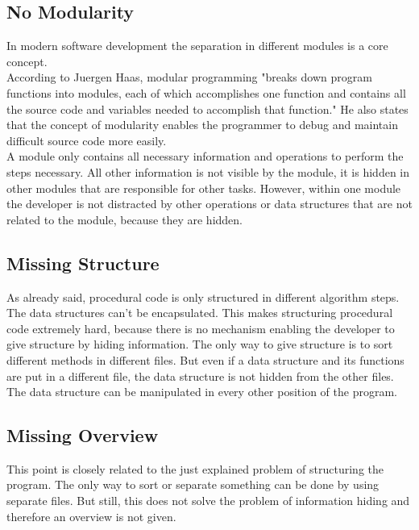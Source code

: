 \subsection*{No Modularity}
\label{problem:nomodularity}
In modern software development the separation in different modules is a core concept.\\

According to Juergen Haas, modular programming "breaks down program functions into modules, each of which accomplishes one function and contains all the source code and variables needed to accomplish that function." \cite{about} He also states that the concept of modularity enables the programmer to debug and maintain difficult source code more easily. \\

A module only contains all necessary information and operations to perform the steps necessary. All other information is not visible by the module, it is hidden in other modules that are responsible for other tasks. However, within one module the developer is not distracted by other operations or data structures that are not related to the module, because they are hidden. 

\subsection*{Missing Structure}
As already said, procedural code is only structured in different algorithm steps. The data structures can't be encapsulated. This makes structuring procedural code extremely hard, because there is no mechanism enabling the developer to give structure by hiding information. The only way to give structure is to sort different methods in different files. But even if a data structure and its functions are put in a different file, the data structure is not hidden from the other files. The data structure can be manipulated in every other position of the program.

\subsection*{Missing Overview}
This point is closely related to the just explained problem of structuring the program. The only way to sort or separate something can be done by using separate files. But still, this does not solve the problem of information hiding and therefore an overview is not given.

